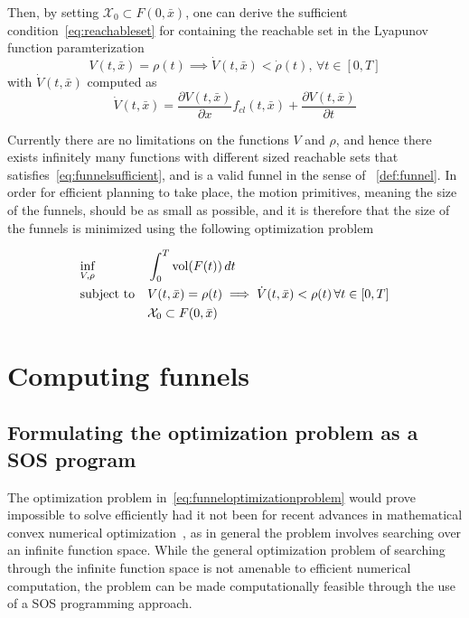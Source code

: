 Then, by setting \(\mathcal{X}_0 \subset F(0,\bar{x})\), one can derive the
sufficient condition~\cref{eq:reachableset} for containing the reachable set in
the Lyapunov function paramterization
\begin{equation}
  \label{eq:funnelsufficient}
  V(t,\bar{x}) = \rho(t) \implies \dot{V}(t,\bar{x}) < \dot{\rho}(t), \, \forall t \in [0,T]
\end{equation}
with \(\dot{V}(t,\bar{x})\) computed as
\begin{equation}
  \dot{V}(t,\bar{x}) = \frac{\partial V(t,\bar{x})}{\partial x} f_{cl}(t,\bar{x}) + \frac{\partial V(t,\bar{x})}{\partial t}
\end{equation}

Currently there are no limitations on the functions \(V\) and \(\rho\), and
hence there exists infinitely many functions with different sized reachable sets
that satisfies~\cref{eq:funnelsufficient}, and is a valid funnel in the sense
of ~\cref{def:funnel}. In order for efficient planning to take place, the motion
primitives, meaning the size of the funnels, should be as small as possible, and
it is therefore that the size of the funnels is minimized using the following
optimization problem~\cite{majumdarFunnelLibrariesRealtime2017}

\begin{align}
  \label{eq:funneloptimizationproblem}
  &\underset{V,\rho}{\text{inf}} \; &&\int_{0}^{T} \operatorname{vol}(F(t))\, dt \\
  &\text{subject to} && V(t,\bar{x}) = \rho (t) \implies \dot{V}(t,\bar{x}) < \rho (t) \, \forall t \in [0,T] \\
  && &\mathcal{X}_0 \subset F(0,\bar{x}) \\
\end{align} 


\section{Computing funnels}

\subsection{Formulating the optimization problem as a SOS program}

The optimization problem in~\cref{eq:funneloptimizationproblem} would prove
impossible to solve efficiently had it not been for recent advances in
mathematical convex numerical
optimization~\cite[Parillo]{parilloStructuredSemidefinitePrograms}, as in
general the problem involves searching over an infinite function space. While
the general optimization problem of searching through the infinite function
space is not amenable to efficient numerical computation, the problem can be
made computationally feasible through the use of a \ac{SOS} programming
approach.

